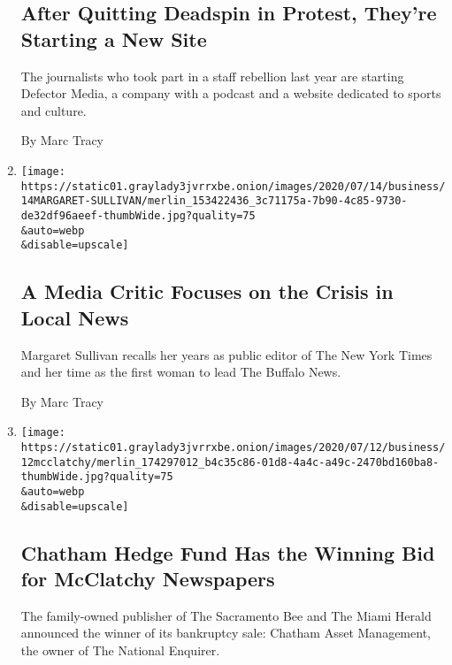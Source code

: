 \begin{enumerate}
{  \subsection{After Quitting Deadspin in Protest, They're Starting a New
  Site}\label{after-quitting-deadspin-in-protest-theyre-starting-a-new-site}}

  The journalists who took part in a staff rebellion last year are
  starting Defector Media, a company with a podcast and a website
  dedicated to sports and culture.

  By Marc Tracy
\item
  \href{/2020/07/14/business/media/margaret-sullivan-local-news.html}{}

  \texttt{[image: https://static01.graylady3jvrrxbe.onion/images/2020/07/14/business/14MARGARET-SULLIVAN/merlin\_153422436\_3c71175a-7b90-4c85-9730-de32df96aeef-thumbWide.jpg?quality=75\\\&auto=webp\\\&disable=upscale]}

  \hypertarget{a-media-critic-focuses-on-the-crisis-in-local-news}{%
  \subsection{A Media Critic Focuses on the Crisis in Local
  News}\label{a-media-critic-focuses-on-the-crisis-in-local-news}}

  Margaret Sullivan recalls her years as public editor of The New York
  Times and her time as the first woman to lead The Buffalo News.

  By Marc Tracy
\item
  \href{/2020/07/12/business/media/hedge-fund-mcclatchy-newspapers.html}{}

  \texttt{[image: https://static01.graylady3jvrrxbe.onion/images/2020/07/12/business/12mcclatchy/merlin\_174297012\_b4c35c86-01d8-4a4c-a49c-2470bd160ba8-thumbWide.jpg?quality=75\\\&auto=webp\\\&disable=upscale]}

  \hypertarget{chatham-hedge-fund-has-the-winning-bid-for-mcclatchy-newspapers}{%
  \subsection{Chatham Hedge Fund Has the Winning Bid for McClatchy
  Newspapers}\label{chatham-hedge-fund-has-the-winning-bid-for-mcclatchy-newspapers}}

  The family-owned publisher of The Sacramento Bee and The Miami Herald
  announced the winner of its bankruptcy sale: Chatham Asset Management,
  the owner of The National Enquirer.


\end{enumerate}

